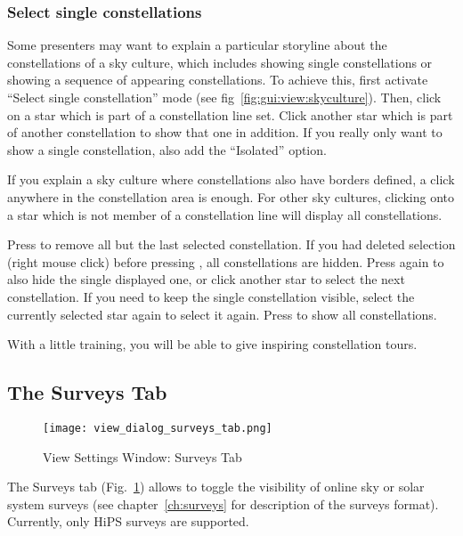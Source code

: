 \subsubsection{Select single constellations}
\label{sec:skyculture:singleConstellations}

Some presenters may want to explain a particular storyline about the
constellations of a sky culture, which includes showing single
constellations or showing a sequence of appearing constellations. To
achieve this, first activate ``Select single constellation'' mode (see
fig~\ref{fig:gui:view:skyculture}).  Then, click on a star
which is part of a constellation line set. Click
another star which is part of another constellation to show that one in addition.
If you really only want to show a single constellation, also add the ``Isolated'' option.

If you explain a sky culture where constellations also have borders
defined, a click anywhere in the constellation area is enough.  For
other sky cultures, clicking onto a star which is not member of a
constellation line will display all constellations.

Press  to remove all but the last selected constellation.
If you had deleted selection (right mouse click) before pressing ,
all constellations are hidden.
Press  again to also hide the single displayed one, or click
another star to select the next constellation. If you need to keep the
single constellation visible, select the currently selected star again
to select it again.  Press  to show all constellations.

With a little training, you will be able to give inspiring
constellation tours.

\subsection{The Surveys Tab}
\label{sec:gui:view:surveys}

\begin{figure}[htbp]
\centering\texttt{[image: view\_dialog\_surveys\_tab.png]}
\caption{View Settings Window: Surveys Tab}
\label{fig:gui:view:surveys}
\end{figure}

The Surveys tab (Fig.~\ref{fig:gui:view:surveys}) allows to toggle the
visibility of online sky or solar system surveys (see chapter~\ref{ch:surveys}
for description of the surveys format).  Currently, only HiPS surveys are
supported.

